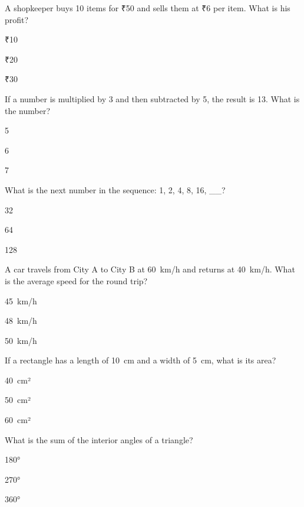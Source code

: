 \begin{enhancedmcq}{A shopkeeper buys 10 items for ₹50 and sells them at ₹6 per item. What is his profit?}
\item ₹10
\item ₹20
\item ₹30

\end{enhancedmcq}
\begin{enhancedmcq}{If a number is multiplied by 3 and then subtracted by 5, the result is 13. What is the number?}
\item 5
\item 6
\item 7

\end{enhancedmcq}
\begin{enhancedmcq}{What is the next number in the sequence: 1, 2, 4, 8, 16, __?}
\item 32
\item 64
\item 128

\end{enhancedmcq}
\begin{enhancedmcq}{A car travels from City A to City B at 60 km/h and returns at 40 km/h. What is the average speed for the round trip?}
\item 45 km/h
\item 48 km/h
\item 50 km/h

\end{enhancedmcq}
\begin{enhancedmcq}{If a rectangle has a length of 10 cm and a width of 5 cm, what is its area?}
\item 40 cm²
\item 50 cm²
\item 60 cm²

\end{enhancedmcq}
\begin{enhancedmcq}{What is the sum of the interior angles of a triangle?}
\item 180°
\item 270°
\item 360°

\end{enhancedmcq}
